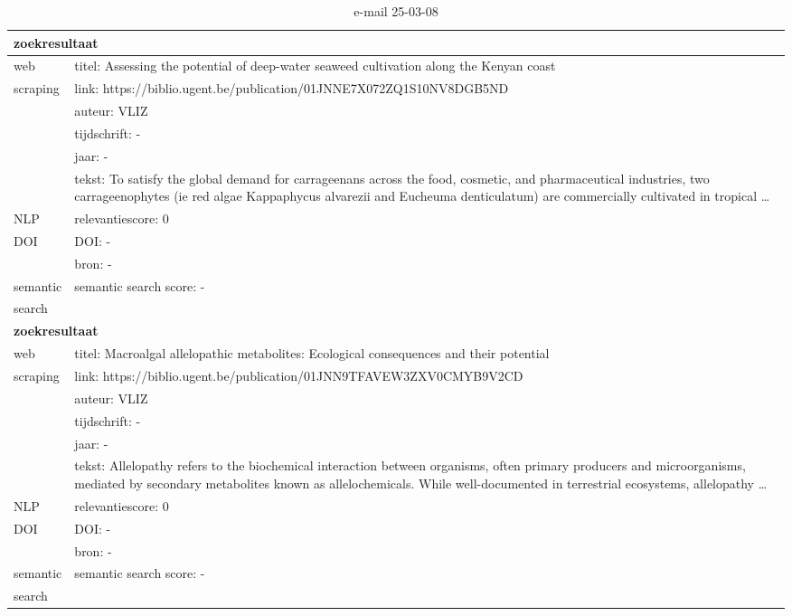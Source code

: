 \begin{table}[h!]
    \caption{e-mail 25-03-08}
    \centering
    \begin{tabularx}{\textwidth}{|p{4cm}|X|} 
        \hline
        \multicolumn{2}{|X|}{\textbf{zoekresultaat}} \\
        \hline
        web &titel:  Assessing the potential of deep-water seaweed cultivation along the Kenyan coast\\
        scraping&link: https://biblio.ugent.be/publication/01JNNE7X072ZQ1S10NV8DGB5ND\\
        &auteur: VLIZ\\
        &tijdschrift: -\\
        &jaar: -\\
        &tekst: To satisfy the global demand for carrageenans across the food, cosmetic, and pharmaceutical industries, two carrageenophytes (ie red algae Kappaphycus alvarezii and Eucheuma denticulatum) are commercially cultivated in tropical …\\
        \hline
        NLP&relevantiescore: 0\\
        \hline
        DOI&DOI: -\\
        &bron: -\\
        \hline
        semantic&semantic search score: -\\
        search&\\
        \hline
        \multicolumn{2}{|X|}{\textbf{zoekresultaat}} \\
        \hline
        web &titel: Macroalgal allelopathic metabolites: Ecological consequences and their potential\\
        scraping&link: https://biblio.ugent.be/publication/01JNN9TFAVEW3ZXV0CMYB9V2CD\\
        &auteur: VLIZ\\
        &tijdschrift: -\\
        &jaar: -\\
        &tekst: Allelopathy refers to the biochemical interaction between organisms, often primary producers and microorganisms, mediated by secondary metabolites known as allelochemicals. While well-documented in terrestrial ecosystems, allelopathy …\\
        \hline
        NLP&relevantiescore: 0\\
        \hline
        DOI&DOI: -\\
        &bron: -\\
        \hline
        semantic&semantic search score: -\\
        search&\\
        \hline
    \end{tabularx}
    \label{table:email20250308}
\end{table}
